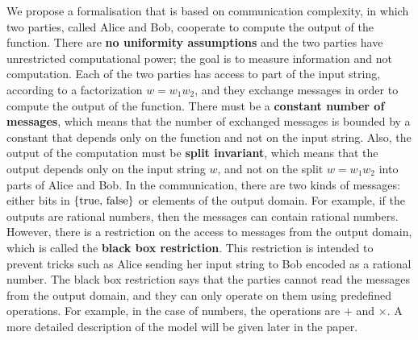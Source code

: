 We propose a formalisation that is based on communication complexity, in which two parties, called Alice and Bob, cooperate to compute the output of the function. There are \textbf{no uniformity assumptions} and the  two parties have unrestricted computational power; the goal is to measure information and not computation.  Each of the two parties has access to part of the input string, according to a factorization $w = w_1 w_2$, and they exchange messages in order to compute the output of the  function. There must be a  \textbf{constant number of messages}, which means that the number of exchanged messages is bounded by a constant that depends only on the function and not on the input string. Also, the  output of the computation must be \textbf{split invariant}, which means that the output depends only on the input string $w$, and not on the split $w = w_1 w_2$ into parts of Alice and Bob. In the communication, there are two kinds of messages:  either bits in $\{\text{true, false}\}$  or elements of the output domain. For example, if the outputs are rational numbers, then the messages can contain rational numbers. However, there is a restriction on the access to messages from the output domain, which is called the \textbf{black box restriction}. This restriction is intended to prevent tricks such as Alice sending her input string to Bob encoded as a rational number. The black box restriction says that the parties cannot read the messages from the output domain, and they can only operate on them using predefined operations. For example, in the case of numbers, the operations are $+$ and $\times$.  A more detailed description of the model will be given later in the paper. 

